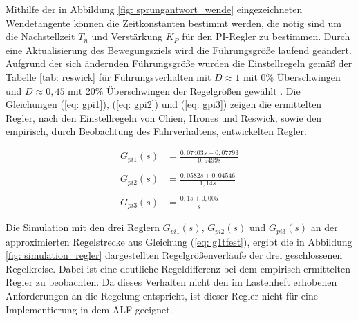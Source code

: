 		
			Mithilfe der in Abbildung \ref{fig: sprungantwort_wende} eingezeichneten Wendetangente können die Zeitkonstanten bestimmt werden, die nötig sind um die Nachstellzeit $T_n$ und Verstärkung $K_P$ für den PI-Regler zu bestimmen. Durch eine Aktualisierung des Bewegungsziels wird die Führungsgröße laufend geändert. Aufgrund der sich ändernden Führungsgröße wurden die Einstellregeln gemäß der Tabelle \ref{tab: reswick} für Führungsverhalten mit $D \approx 1 $ mit 0\% Überschwingen und $D \approx 0{,}45 $  mit 20\% Überschwingen der Regelgrößen gewählt \cite{praktischeregelungstechnik}. Die Gleichungen (\ref{eq: gpi1}), (\ref{eq: gpi2}) und (\ref{eq: gpi3}) zeigen die ermittelten Regler, nach den Einstellregeln von Chien, Hrones und Reswick, sowie den empirisch, durch Beobachtung des Fahrverhaltens, entwickelten Regler.
		
			\begin{align}
			\label{eq: gpi1}
			G_{pi1}(s) &= \frac{0{,}07403s+0{,}07793}{0{,}9499s}\\\nonumber\\
			\label{eq: gpi2}
			G_{pi2}(s) &= \frac{0{,}0582s+0{,}04546}{1{,}14s}\\\nonumber\\
			\label{eq: gpi3}
			G_{pi3}(s) &= \frac{0{,}1s+0{,}005}{s}
			\end{align}
		
	
			Die Simulation mit den drei Reglern $G_{pi1}(s)$, $G_{pi2}(s)$ und $G_{pi3}(s)$ an der approximierten Regelstrecke aus Gleichung (\ref{eq: g1tfest}), ergibt die in Abbildung \ref{fig: simulation_regler} dargestellten Regelgrößenverläufe der drei geschlossenen Regelkreise. Dabei ist eine deutliche Regeldifferenz bei dem empirisch ermittelten Regler zu beobachten. Da dieses Verhalten nicht den im Lastenheft erhobenen Anforderungen an die Regelung entspricht, ist dieser Regler nicht für eine Implementierung in dem ALF geeignet.


